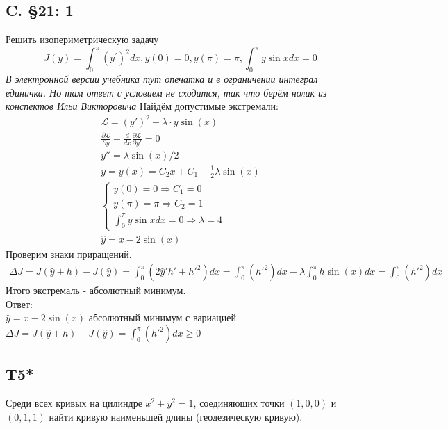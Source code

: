 \documentclass{article}
\newcommand{\Lagr}{\mathcal{L}}
\begin{document}
\subsection{C. \S21: 1}
Решить изопериметрическую задачу
\begin{equation}
J(y)=\int_{0}^{\pi}\left(y^{\prime}\right)^{2} d x, y(0)=0, y(\pi)=\pi, \int_{0}^{\pi} y \sin x d x=0
\end{equation}
 \textcolor[rgb]{0.480469,0.566406,0.480469}{\textit{В электронной версии учебника тут опечатка и в ограничении интеграл единичка. Но там ответ с условием не сходится, так что берём нолик из конспектов Ильи Викторовича}}                                               
Найдём допустимые экстремали:
\begin{gather*}
    \Lagr = (y')^2 + \lambda \cdot y \sin{(x)}\\
    \frac{\partial \Lagr}{\partial y}  - \frac{d }{d x} \frac{\partial \Lagr}{\partial y'} =0   \\
    y''=\lambda \sin{(x)}/2\\
    y=y(x)=C_2 x+C_1-\frac{1}{2} \lambda  \sin (x)\\
    \begin{cases}
        y(0)=0 \Rightarrow C_1=0\\
        y(\pi)=\pi \Rightarrow C_2 = 1\\
        \int_{0}^{\pi} y \sin x d x=0 \Rightarrow \lambda = 4
    \end{cases}\\
    \hat y = x-2 \sin{(x)}
\end{gather*}
Проверим знаки приращений.
\begin{gather*}
    \Delta J = J(\hat y + h) - J(\hat y) = \int_0^{\pi} (2\hat{y}'h' + h'^2) dx= \int_0^{\pi} (h'^2) dx - \lambda \int_0^\pi h \sin{(x)}dx = \int_0^{\pi} (h'^2) dx
\end{gather*}
Итого экстремаль - абсолютный минимум.\\
Ответ:\\
$\hat y = x-2 \sin{(x)}$  абсолютный минимум с вариацией $\Delta J = J(\hat y + h) - J(\hat y) =\int_0^{\pi} (h'^2) dx \geq 0$ 

\subsection{T5*}
Среди всех кривых на цилиндре $x^{2}+y^{2}=1$, соединяющих точки $(1,0,0)$ и $(0,1,1)$ найти кривую наименьшей длины (геодезическую кривую).
\end{document}
